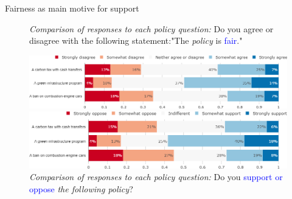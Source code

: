 \begin{framefont}{\small}
\begin{frame}{Fairness as main motive for support}%
\begin{figure}[h!]
\vspace{-.1cm}
\centering
\caption{\textit{Comparison of responses to each policy question:} Do you agree or disagree with the following statement:"The \textit{policy} is \textcolor{blue}{fair}."}
\includegraphics[width=.7\paperwidth]{../figures/FR/policies_fair_FR.png}
\vspace{-.1cm}
\centering
\caption{\textit{Comparison of responses to each policy question:} Do you \textcolor{blue}{support or oppose} \textit{the following policy}?}
\includegraphics[width=.7\paperwidth]{../figures/FR/policies_support_FR.png}
\end{figure}


\end{frame}



\end{framefont}
